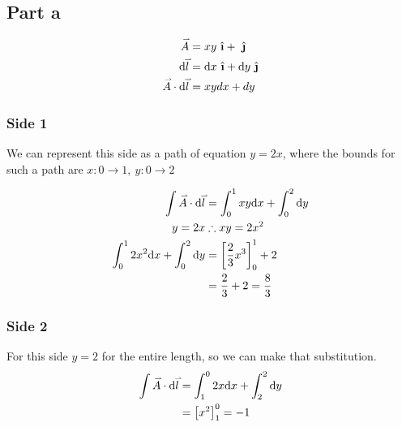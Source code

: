 \documentclass{article}
\newcommand{\ihat}{\ {\hat{\textbf{\i}}}}
\newcommand{\jhat}{\ {\hat{\textbf{\j}}}}
\renewcommand{\d}{\text{d}}
\renewcommand{\vec}[1]{\accentset{\rightharpoonup}{#1}}
\newcommand{\dvecdot}[2]{\vec{#1}\cdot\d \vec{#2}}
\begin{document}
\subsection*{Part a}
\begin{center}
\end{center}

\begin{align*}
    \vec{A} &= xy\ihat + \jhat\\
    \d \vec{l} &= \d x\ihat + \d y\jhat\\
    \dvecdot{A}{l} &= xydx + dy\\ 
\end{align*}

\subsubsection*{Side 1}
We can represent this side as a path of equation $y = 2x$, where the bounds for such a path are 
$x: 0 \rightarrow 1,\ y: 0 \rightarrow 2$

\begin{align*}
    \int \dvecdot{A}{l} &= \int_0^1 xy \d x + \int_0^2\d y\\
    y = 2x &\therefore xy = 2x^2\\
    \int_0^1 2x^2 \d x + \int_0^2\d y &= \left[\frac{2}{3}x^3\right]_0^1 + 2\\
    &= \frac{2}{3} + 2 = \frac{8}{3}\\
\end{align*}

\subsubsection*{Side 2}
For this side $y = 2$ for the entire length, so we can make that substitution.
\begin{align*}
    \int \dvecdot{A}{l} &= \int_1^0 2x \d x + \int_2^2\d y\\
    &= \left[x^2\right]_1^0 = -1
\end{align*}
\end{document}
